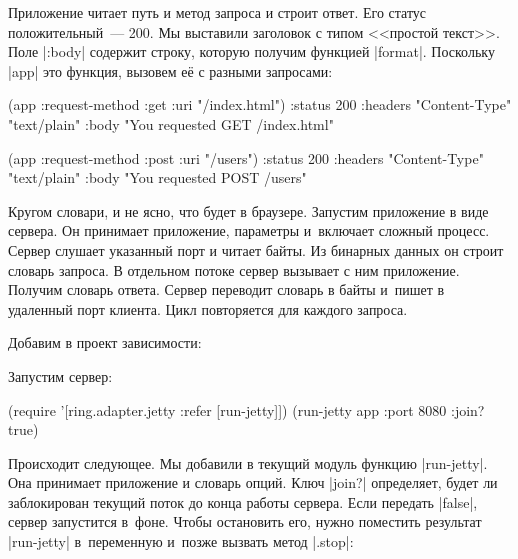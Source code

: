 Приложение читает путь и метод запроса и строит ответ. Его статус
положительный~--- 200. Мы выставили заголовок с типом <<простой текст>>. Поле
\spverb|:body| содержит строку, которую получим функцией
\spverb|format|. Поскольку \spverb|app| это функция, вызовем е\"{е} с разными
запросами:

\begin{english}
  \begin{clojure}
(app {:request-method :get :uri "/index.html"})
{:status 200
 :headers {"Content-Type" "text/plain"}
 :body "You requested GET /index.html"}

(app {:request-method :post :uri "/users"})
{:status 200
 :headers {"Content-Type" "text/plain"}
 :body "You requested POST /users"}
  \end{clojure}
\end{english}

Кругом словари, и не ясно, что будет в браузере. Запустим приложение в виде
сервера. Он принимает приложение, параметры и~включает сложный процесс. Сервер
слушает указанный порт и читает байты. Из бинарных данных он строит словарь
запроса. В отдельном потоке сервер вызывает с ним приложение. Получим словарь
ответа. Сервер переводит словарь в байты и~пишет в удаленный порт клиента. Цикл
повторяется для каждого запроса.


Добавим в проект зависимости:

\begin{english}
  \begin{clojure}
  \end{clojure}
\end{english}

\noindent
Запустим сервер:

\begin{english}
  \begin{clojure}
(require '[ring.adapter.jetty :refer [run-jetty]])
(run-jetty app {:port 8080 :join? true})
  \end{clojure}
\end{english}

Происходит следующее. Мы добавили в текущий модуль функцию
\spverb|run-jetty|. Она принимает приложение и словарь опций. Ключ
\spverb|join?| определяет, будет ли заблокирован текущий поток до конца работы
сервера. Если передать \spverb|false|, сервер запустится в~фоне. Чтобы
остановить его, нужно поместить результат \spverb|run-jetty| в~переменную
и~позже вызвать метод \spverb|.stop|:

